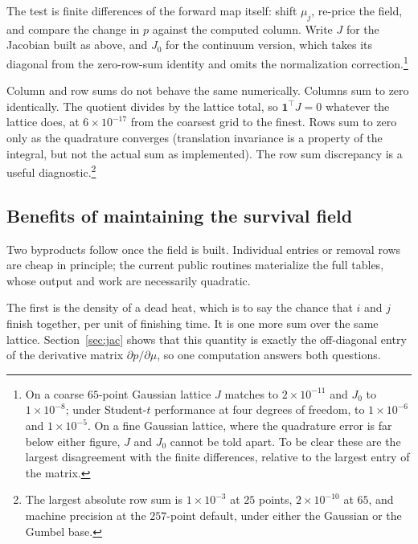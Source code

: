 \documentclass[11pt]{article}
\begin{document}
The test is finite differences of the forward map itself: shift $\mu_j$,
re-price the field, and compare the change in $p$ against the computed
column. Write $J$ for the Jacobian built as above, and $J_0$ for the
continuum version, which takes its diagonal from the zero-row-sum
identity and omits the normalization correction.\footnote{On a coarse $65$-point Gaussian lattice $J$ matches
to $2\times10^{-11}$ and $J_0$ to $1\times10^{-8}$; under Student-$t$
performance at four degrees of freedom, to $1\times10^{-6}$ and
$1\times10^{-5}$. On a fine Gaussian lattice, where the quadrature error
is far below either figure, $J$ and $J_0$ cannot be told apart. To be clear these are the largest disagreement with the finite differences, relative to the largest
entry of the matrix.}

Column and row sums do not behave the same numerically. Columns sum to zero identically. The quotient
divides by the lattice total, so $\mathbf{1}^{\top}J=0$ whatever the
lattice does, at $6\times10^{-17}$ from the coarsest grid to the finest.
Rows sum to zero only as the quadrature converges (translation
invariance is a property of the integral, but not the actual sum as implemented). The row sum discrepancy is a useful diagnostic.\footnote{The largest absolute row sum is
$1\times10^{-3}$ at $25$ points,
$2\times10^{-10}$ at $65$, and machine precision at the $257$-point
default, under either the Gaussian or the Gumbel base.}

\subsection{Benefits of maintaining the survival field}

Two byproducts follow once the field is built. Individual entries or removal rows are cheap in principle; the current public routines materialize the full tables, whose output and work are necessarily quadratic.

The first is the density of a dead heat, which is to say the chance that $i$ and $j$
finish together, per unit of finishing time. It is one more sum over the
same lattice. Section~\ref{sec:jac} shows that this quantity is exactly
the off-diagonal entry of the derivative matrix $\partial p/\partial\mu$,
so one computation answers both questions.
\end{document}
